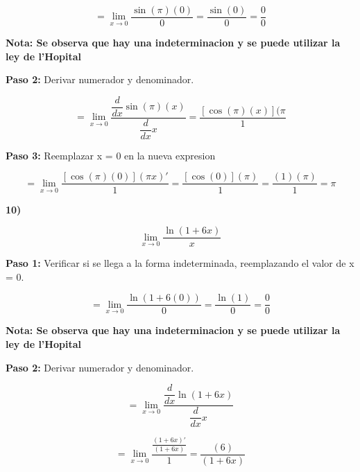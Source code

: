 \documentclass[12pt,a4paper]{article}
\begin{document}
\[
= \lim_{x \to 0} \frac{\sin (\pi)(0)}{0}= \frac{\sin (0)}{0}= \frac{0}{0}
\]

\vspace{0.2cm}

\textbf{Nota: Se observa que hay una indeterminacion y se puede utilizar la ley de l'Hopital }

\vspace{0.5cm}

\textbf{Paso 2:}
\vspace{0.2cm}
Derivar numerador y denominador.

\[
= \lim_{x \to 0} \frac{\dfrac{d}{dx} \sin (\pi)(x)}{\dfrac{d}{dx} x}= \frac{[\cos (\pi) (x)](\pi}{1}
\]


\vspace{0.2cm}



\textbf{Paso 3:}
\vspace{0.2cm}
Reemplazar x = 0 en la nueva expresion

\[
= \lim_{x \to 0} \frac{[\cos (\pi) (0)](\pi x)'}{1}= \frac{[\cos(0)](\pi)}{1} = \frac{(1)(\pi)}{1}= \pi
\]


\newpage



\textbf{10)}

\[
\lim_{x \to 0} \frac{\ln (1 + 6x)}{x} 
\]

\vspace{0.2cm}

\textbf{Paso 1:}
\vspace{0.2cm}
Verificar si se llega a la forma indeterminada, reemplazando el valor de x = 0.

\[
= \lim_{x \to 0} \frac{\ln (1 + 6(0))}{0}= \frac{\ln (1)}{0}=  \frac{0}{0}
\]


\vspace{0.2cm}

\textbf{Nota: Se observa que hay una indeterminacion y se puede utilizar la ley de l'Hopital }

\vspace{0.5cm}

\textbf{Paso 2:}
\vspace{0.2cm}
Derivar numerador y denominador.


\[
= \lim_{x \to 0} \frac{\dfrac{d}{dx} \ln (1+6x)}{\dfrac{d}{dx} x}
\]

\[
= \lim_{x \to 0} \frac{\frac{(1 + 6x)'}{(1 + 6x)}}{1}= \frac{(6)}{(1 + 6x)}
\]

\vspace{0.2cm}
\end{document}
